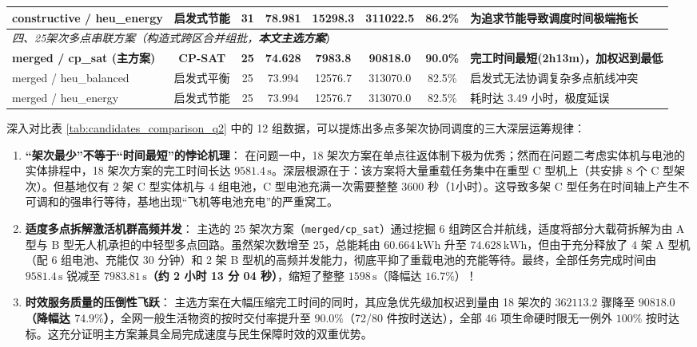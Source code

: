 \documentclass[withoutpreface,bwprint]{format}
\begin{document}
\begin{table}[H]
\begin{tabularx}{\textwidth}{l c c c c c c >{\raggedright\arraybackslash}X}
constructive / heu\_energy & 启发式节能 & 31 & 78.981 & 15298.3 & 311022.5 & 86.2\% & 为追求节能导致调度时间极端拖长 \\
\midrule
\multicolumn{8}{l}{\textit{四、25架次多点串联方案（构造式跨区合并组批，\textbf{本文主选方案}}）} \\
\textbf{merged / cp\_sat (主方案)} & \textbf{CP-SAT} & \textbf{25} & \textbf{74.628} & \textbf{7983.8} & \textbf{90818.0} & \textbf{90.0\%} & \textbf{完工时间最短(2h13m)，加权迟到最低} \\
merged / heu\_balanced & 启发式平衡 & 25 & 73.994 & 12576.7 & 313070.0 & 82.5\% & 启发式无法协调复杂多点航线冲突 \\
merged / heu\_energy & 启发式节能 & 25 & 73.994 & 12576.7 & 313070.0 & 82.5\% & 耗时达 3.49 小时，极度延误 \\
\bottomrule
\end{tabularx}
\end{table}

深入对比表 \ref{tab:candidates_comparison_q2} 中的 12 组数据，可以提炼出多点多架次协同调度的三大深层运筹规律：
\begin{enumerate}[leftmargin=*]
    \item \textbf{“架次最少”不等于“时间最短”的悖论机理}：
    在问题一中，18 架次方案在单点往返体制下极为优秀；然而在问题二考虑实体机与电池的实体排程中，18 架次方案的完工时间长达 $9581.4\,\text{s}$。深层根源在于：该方案将大量重载任务集中在重型 C 型机上（共安排 8 个 C 型架次）。但基地仅有 2 架 C 型实体机与 4 组电池，C 型电池充满一次需要整整 3600 秒（1小时）。这导致多架 C 型任务在时间轴上产生不可调和的强串行等待，基地出现“飞机等电池充电”的严重窝工。
    \item \textbf{适度多点拆解激活机群高频并发}：
    主选的 25 架次方案（\texttt{merged/cp\_sat}）通过挖掘 6 组跨区合并航线，适度将部分大载荷拆解为由 A 型与 B 型无人机承担的中轻型多点回路。虽然架次数增至 25，总能耗由 $60.664\,\text{kWh}$ 升至 $74.628\,\text{kWh}$，但由于充分释放了 4 架 A 型机（配 6 组电池、充能仅 30 分钟）和 2 架 B 型机的高频并发能力，彻底平抑了重载电池的充能等待。最终，全部任务完成时间由 $9581.4\,\text{s}$ 锐减至 \textbf{$7983.81\,\text{s}$（约 2 小时 13 分 04 秒）}，缩短了整整 $1598\,\text{s}$（降幅达 $16.7\%$）！
    \item \textbf{时效服务质量的压倒性飞跃}：
    主选方案在大幅压缩完工时间的同时，其应急优先级加权迟到量由 18 架次的 $362113.2$ 骤降至 \textbf{$90818.0$（降幅达 $74.9\%$）}，全网一般生活物资的按时交付率提升至 $90.0\%$（72/80 件按时送达），全部 46 项生命硬时限无一例外 $100\%$ 按时达标。这充分证明主方案兼具全局完成速度与民生保障时效的双重优势。
\end{enumerate}
\end{document}
